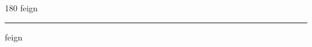 
\begin{frame}
\begin{center}
\begin{turn}{180}
{\fontsize{2.5cm}{1em}\selectfont feign}
\end{turn}
\vspace{1em}\par  
\hrule
\vspace{1em}\par  
{\fontsize{2.5cm}{1em}\selectfont feign}
\end{center}
\end{frame}
